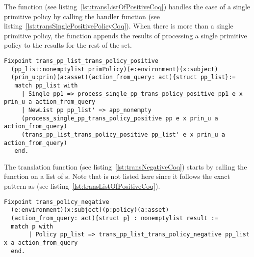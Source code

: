 The function  (see listing~\ref{lst:transListOfPositiveCoq}) handles the case of a single primitive policy by calling the handler function  (see listing~\ref{lst:transSinglePositivePolicyCoq}). When there is more than a single primitive policy, the function  appends the results of processing a single primitive policy to the results for the rest of the set.

\begin{lstlisting}
Fixpoint trans_pp_list_trans_policy_positive
  (pp_list:nonemptylist primPolicy)(e:environment)(x:subject)
  (prin_u:prin)(a:asset)(action_from_query: act){struct pp_list}:=
   match pp_list with
     | Single pp1 => process_single_pp_trans_policy_positive pp1 e x prin_u a action_from_query
     | NewList pp pp_list' => app_nonempty
	 (process_single_pp_trans_policy_positive pp e x prin_u a action_from_query) 
	 (trans_pp_list_trans_policy_positive pp_list' e x prin_u a action_from_query)
   end.
\end{lstlisting}


The  translation function (see listing~\ref{lst:transNegativeCoq}) starts by calling the function  on a list of s. Note that  is not listed here since it follows the exact pattern as  (see listing~\ref{lst:transListOfPositiveCoq}).

\begin{minipage}[c]{0.95\textwidth}
\begin{lstlisting}
Fixpoint trans_policy_negative
  (e:environment)(x:subject)(p:policy)(a:asset)
  (action_from_query: act){struct p} : nonemptylist result :=  
  match p with  
       | Policy pp_list => trans_pp_list_trans_policy_negative pp_list x a action_from_query
  end.
\end{lstlisting}
\end{minipage}

